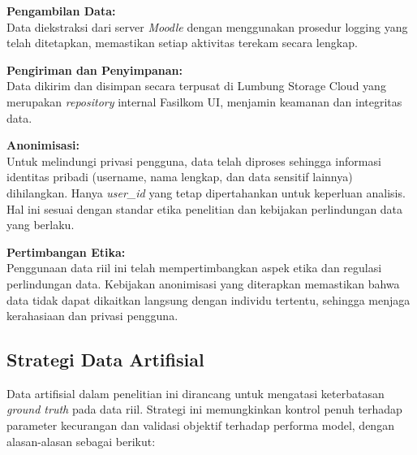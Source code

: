 \textbf{Pengambilan Data:} \\
Data diekstraksi dari server \textit{Moodle} dengan menggunakan prosedur logging yang telah ditetapkan, memastikan setiap aktivitas terekam secara lengkap.

\textbf{Pengiriman dan Penyimpanan:} \\
Data dikirim dan disimpan secara terpusat di Lumbung Storage Cloud yang merupakan \textit{repository} internal Fasilkom UI, menjamin keamanan dan integritas data.

\textbf{Anonimisasi:} \\
Untuk melindungi privasi pengguna, data telah diproses sehingga informasi identitas pribadi (username, nama lengkap, dan data sensitif lainnya) dihilangkan. Hanya \textit{user\_id} yang tetap dipertahankan untuk keperluan analisis. Hal ini sesuai dengan standar etika penelitian dan kebijakan perlindungan data yang berlaku.

\textbf{Pertimbangan Etika:} \\
Penggunaan data riil ini telah mempertimbangkan aspek etika dan regulasi perlindungan data. Kebijakan anonimisasi yang diterapkan memastikan bahwa data tidak dapat dikaitkan langsung dengan individu tertentu, sehingga menjaga kerahasiaan dan privasi pengguna.

\subsection{Strategi Data Artifisial}
\label{sec:dataArtifisial}
Data artifisial dalam penelitian ini dirancang untuk mengatasi keterbatasan \textit{ground truth} pada data riil. Strategi ini memungkinkan kontrol penuh terhadap parameter kecurangan dan validasi objektif terhadap performa model, dengan alasan-alasan sebagai berikut:

